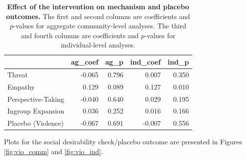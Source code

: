 \documentclass[11pt]{article}
\begin{document}
\begin{table}[H]
\begin{center}

\begin{tabular}{l|r|r|r|r}
\hline
  & ag\_coef & ag\_p & ind\_coef & ind\_p\\
\hline
Threat & -0.065 & 0.796 & 0.007 & 0.350\\
\hline
Empathy & 0.129 & 0.089 & 0.127 & 0.010\\
\hline
Perspective-Taking & -0.040 & 0.640 & 0.029 & 0.195\\
\hline
Ingroup Expansion & 0.036 & 0.252 & 0.016 & 0.166\\
\hline
Placebo (Violence) & -0.067 & 0.691 & -0.007 & 0.556\\
\hline
\end{tabular}


\caption{\label{tab:mech_ind_tab}\textbf{Effect of the intervention on mechanism and placebo outcomes.} The first and second columns are coefficients and $p$-values for aggregate community-level analyses.  The third and fourth columns are coefficients and $p$-values for individual-level analyses.}
\end{center}
\end{table}

Plots for the social desirability check/placebo outcome are presented in
Figures \ref{fig:vio_comm} and \ref{fig:vio_ind}.
\end{document}
